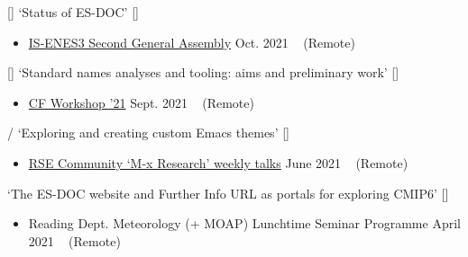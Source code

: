 \begin{talks}

    \talk
	{\faCommentingO \hspace{1mm} [\faEnvelopeO] \hspace{1mm} `Status of ES-DOC' [\href{https://github.com/sadielbartholomew/sadielbartholomew/blob/master/talks-and-workshops/is-enes3-ga2-es-doc-status.pdf}{\small{\linkSymbol}}]}
	{
	\begin{itemize}[leftmargin=.4in]
	    \item \href{https://is.enes.org/workshops-detailed/}{IS-ENES3 Second General Assembly}
	    \hfill Oct. 2021 ~ (Remote)
	\end{itemize}
	}

    \talk
	{\faCommentingO \hspace{1mm} [\faEnvelopeO] \hspace{1mm} `Standard names analyses and tooling: aims and preliminary work' [\href{https://github.com/sadielbartholomew/sadielbartholomew/blob/master/talks-and-workshops/cf-workshop-21-standard-names.pdf}{\small{\linkSymbol}}]}
	{
	\begin{itemize}[leftmargin=.4in]
	    \item \href{https://cfconventions.org/Meetings/2021-Workshop.html}{CF Workshop '21}
	    \hfill Sept. 2021 ~ (Remote)
	\end{itemize}
	}

    \talk
	{\faCommentingO/\faWrench \hspace{1mm} `Exploring and creating custom Emacs themes' [\href{https://github.com/sadielbartholomew/sadielbartholomew/blob/master/talks-and-workshops/emacs-themes-talk.org}{\small{\linkSymbol}}]}
	{
	\begin{itemize}[leftmargin=.4in]
	    \item \href{https://m-x-research.github.io/}{RSE Community `M-x Research' weekly talks}
	    \hfill June 2021 ~ (Remote)
	\end{itemize}
	}

    \talk
	{\faCommentingO \hspace{1mm} `The ES-DOC website and Further Info URL as portals for exploring CMIP6' [\href{https://github.com/sadielbartholomew/sadielbartholomew/blob/master/talks-and-workshops/es-doc-portals-for-cmip6.pdf}{\small{\linkSymbol}}]}
	{
	\begin{itemize}[leftmargin=.4in]
	    \item Reading Dept. Meteorology (+ MOAP) Lunchtime Seminar Programme
	    \hfill April 2021 ~ (Remote)
	\end{itemize}
	}


\end{talks}
